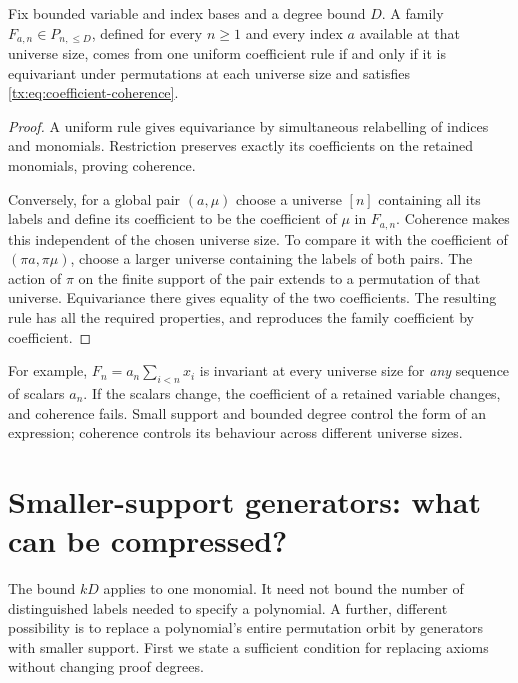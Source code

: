 \begin{proposition}\label{tx:prop:coherent-family}
Fix bounded variable and index bases and a degree bound $D$. A family
$F_{a,n}\in P_{n,\le D}$, defined for every $n\ge1$ and every index
$a$ available at that universe size, comes from one uniform coefficient rule if
and only if it is equivariant under permutations at each universe size and
satisfies \eqref{tx:eq:coefficient-coherence}.
\end{proposition}
\begin{proof}
A uniform rule gives equivariance by simultaneous relabelling of
indices and monomials. Restriction preserves exactly its coefficients
on the retained monomials, proving coherence.

Conversely, for a global pair $(a,\mu)$ choose a universe $[n]$ containing all
its labels and define its coefficient to be the coefficient of $\mu$
in $F_{a,n}$. Coherence makes this independent of the chosen universe size.
To compare it with the coefficient of $(\pi a,\pi\mu)$, choose a
larger universe containing the labels of both pairs. The action of $\pi$
on the finite support of the pair extends to a permutation of that
universe. Equivariance there gives equality of the two coefficients.
The resulting rule has all the required properties, and reproduces
the family coefficient by coefficient.
\end{proof}

For example, $F_n=a_n\sum_{i<n}x_i$ is invariant at every universe size for
\emph{any} sequence of scalars $a_n$. If the scalars change, the
coefficient of a retained variable changes, and coherence fails.
Small support and bounded degree control the form of an expression;
coherence controls its behaviour across different universe sizes.

\section{Smaller-support generators: what can be compressed?}\label{tx:sec:support-compression}
The bound $kD$ applies to one monomial. It need not bound the number
of distinguished labels needed to specify a polynomial. A further,
different possibility is to replace a polynomial's entire permutation
orbit by generators with smaller support. First we state a sufficient
condition for replacing axioms without changing proof degrees.

